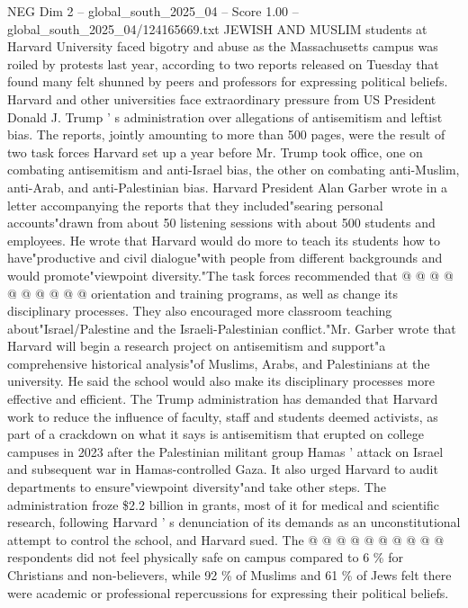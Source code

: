 \begin{textsample}{NEG Dim 2 – global\_south\_2025\_04 – Score 1.00 – global\_south\_2025\_04/124165669.txt}  \label{ex:f2_neg_172}
JEWISH AND MUSLIM students at Harvard University faced bigotry and abuse as the Massachusetts campus was roiled by protests last year, according to two reports released on Tuesday that found many felt shunned by peers and professors for expressing political beliefs.
Harvard and other universities face extraordinary pressure from US President Donald J.
Trump ' s administration over allegations of antisemitism and leftist bias.
The reports, jointly amounting to more than 500 pages, were the result of two task forces Harvard set up a year before Mr.
Trump took office, one on combating antisemitism and anti-Israel bias, the other on combating anti-Muslim, anti-Arab, and anti-Palestinian bias.
Harvard President Alan Garber wrote in a letter accompanying the reports that they included"searing personal accounts"drawn from about 50 listening sessions with about 500 students and employees.
He wrote that Harvard would do more to teach its students how to have"productive and civil dialogue"with people from different backgrounds and would promote"viewpoint diversity."The task forces recommended that @ @ @ @ @ @ @ @ @ @ orientation and training programs, as well as change its disciplinary processes.
They also encouraged more classroom teaching about"Israel/Palestine and the Israeli-Palestinian conflict."Mr.
Garber wrote that Harvard will begin a research project on antisemitism and support"a comprehensive historical analysis"of Muslims, Arabs, and Palestinians at the university.
He said the school would also make its disciplinary processes more effective and efficient.
The Trump administration has demanded that Harvard work to reduce the influence of faculty, staff and students deemed activists, as part of a crackdown on what it says is antisemitism that erupted on college campuses in 2023 after the Palestinian militant group Hamas ' attack on Israel and subsequent war in Hamas-controlled Gaza.
It also urged Harvard to audit departments to ensure"viewpoint diversity"and take other steps.
The administration froze \$2.2 billion in grants, most of it for medical and scientific research, following Harvard ' s denunciation of its demands as an unconstitutional attempt to control the school, and Harvard sued.
The @ @ @ @ @ @ @ @ @ @ respondents did not feel physically safe on campus compared to 6 \% for Christians and non-believers, while 92 \% of Muslims and 61 \% of Jews felt there were academic or professional repercussions for expressing their political beliefs.

\end{textsample}
